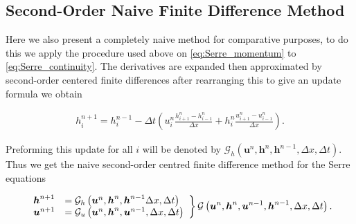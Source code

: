 \documentclass[SingleSpace,12pt,Proceedings]{Serre_ASCE}
\begin{document}
\subsection{Second-Order Naive Finite Difference Method}
Here we also present a completely naive method for comparative purposes, to do this we apply the procedure used above on \eqref{eq:Serre_momentum} to \eqref{eq:Serre_continuity}. The derivatives are expanded then approximated by second-order centered finite differences after rearranging this to give an update formula we obtain
\begin{linenomath*}
\begin{gather}
h^{n+1}_i = h^{n-1}_i - \Delta t \left(u^{n}_{i}\frac{h^{n}_{i+1} - h^{n}_{i-1}}{\Delta x} + h^{n}_{i}\frac{u^{n}_{i+1} - u^{n}_{i-1}}{\Delta x}\right).
\end{gather}
\end{linenomath*}
Preforming this update for all $i$ will be denoted by $\mathcal{G}_h\left(\boldsymbol{u}^n,\boldsymbol{h}^n,\boldsymbol{h}^{n-1} ,\Delta x, \Delta t \right)$.
Thus we get the naive second-order centred finite difference method for the Serre equations
\begin{linenomath*}
\begin{gather}
\left.
\begin{array}{l l}
\boldsymbol{h}^{n+1}&=\mathcal{G}_h\left(\boldsymbol{u}^n,\boldsymbol{h}^n,\boldsymbol{h}^{n-1} \Delta x, \Delta t \right) \\
\boldsymbol{u}^{n+1}&=\mathcal{G}_u\left(\boldsymbol{u}^n,\boldsymbol{h}^n, \boldsymbol{u}^{n-1}, \Delta x, \Delta t \right)
\end{array} \right\rbrace \mathcal{G}\left(\boldsymbol{u}^n,\boldsymbol{h}^n, \boldsymbol{u}^{n-1},\boldsymbol{h}^{n-1}, \Delta x, \Delta t \right).
\end{gather}
\end{linenomath*}
\end{document}
